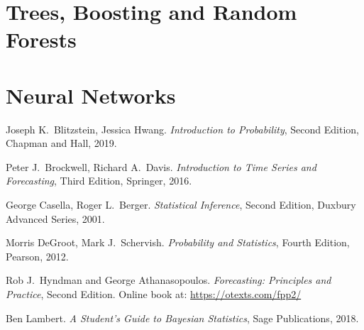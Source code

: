 \documentclass[11pt,a4]{article}
\theoremstyle{definition}
\begin{document}
\section{Trees, Boosting and Random Forests}

\section{Neural Networks}

\begin{thebibliography}{99}
  Joseph K.~Blitzstein, Jessica Hwang. \emph{Introduction 
to Probability}, Second Edition, Chapman and Hall, 2019.

 Peter J.~Brockwell, Richard A.~Davis. 
\emph{Introduction to Time Series and Forecasting}, Third Edition, Springer, 
2016. 

 George Casella, Roger L.~Berger. \emph{Statistical Inference}, 
Second Edition, Duxbury Advanced Series, 2001.

 Morris DeGroot, Mark J.~Schervish. \emph{Probability and 
Statistics}, Fourth Edition, Pearson, 2012.
  
 Rob J.~Hyndman and George Athanasopoulos. \emph{Forecasting: 
Principles and Practice}, Second Edition. Online book at: 
\url{https://otexts.com/fpp2/}

 Ben Lambert. \emph{A Student's Guide to Bayesian Statistics}, 
Sage Publications, 2018. 

\end{thebibliography}
\end{document}
